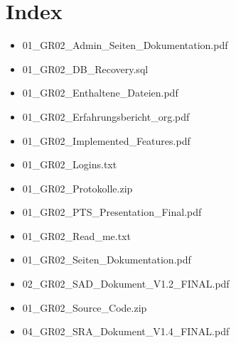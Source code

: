 \documentclass[a4paper,10pt]{scrreprt}
\begin{document}
\section*{Index}

\begin{itemize}
 \item [] 01\_GR02\_Admin\_Seiten\_Dokumentation.pdf
 \item [] 01\_GR02\_DB\_Recovery.sql
 \item [] 01\_GR02\_Enthaltene\_Dateien.pdf
 \item [] 01\_GR02\_Erfahrungsbericht\_org.pdf
 \item [] 01\_GR02\_Implemented\_Features.pdf
 \item [] 01\_GR02\_Logins.txt
 \item [] 01\_GR02\_Protokolle.zip
\item [] 01\_GR02\_PTS\_Presentation\_Final.pdf
 \item [] 01\_GR02\_Read\_me.txt
 \item [] 01\_GR02\_Seiten\_Dokumentation.pdf
 \item [] 02\_GR02\_SAD\_Dokument\_V1.2\_FINAL.pdf
\item [] 01\_GR02\_Source\_Code.zip
 \item [] 04\_GR02\_SRA\_Dokument\_V1.4\_FINAL.pdf
\end{itemize}
\end{document}
